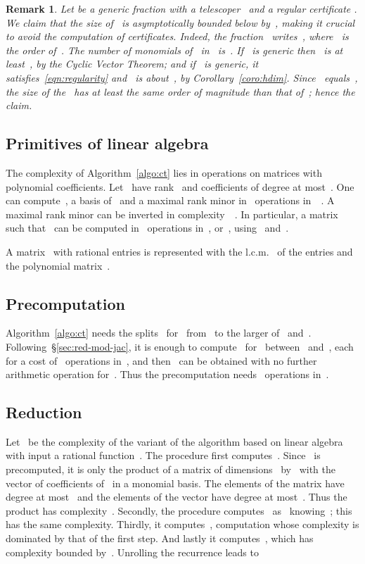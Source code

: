 \documentclass{sig-alternate}
\newtheorem{remark}[thm]{Remark}
\begin{document}
\begin{remark}\label{rem:size-cert}\normalfont
Let  be a generic fraction with a telescoper~ and a regular certificate .
We claim that the size of~ is asymptotically bounded below by~, making it crucial to avoid the computation of certificates.
Indeed, the fraction~ writes~, where~ is the order of~.
The number of monomials of~ in~ is~.
  If~ is generic then~ is at least~, by the Cyclic Vector Theorem;
  and if~ is generic, it satisfies~\eqref{eqn:regularity} and~ is about~, by Corollary~\ref{coro:hdim}.
  Since~ equals~, the size of the~ has at least the same order of magnitude than that of~; hence the claim.
\end{remark}

\subsection{Primitives of linear algebra}\label{sec:pol-linalg}

\noindent The complexity of Algorithm~\ref{algo:ct} lies in operations on matrices with polynomial coefficients.
Let~ have rank~ and coefficients of degree at most~.
One can compute~, a basis of~ and a maximal rank minor in~ operations in~~\cite{Zho13}.
A maximal rank minor can be inverted in complexity~~\cite{JeaVil05}.
In particular, a matrix~ such that~ can be computed in~ operations in~, or~, using~ and~.


A matrix~ with rational entries is represented with the l.c.m.~ of the entries and the polynomial matrix~. 
\subsection{Precomputation}

\noindent Algorithm~\ref{algo:ct} needs the splits~ for~ from~ to the larger of~ and~.
Following~\S\ref{sec:red-mod-jac}, it is enough to compute~ for~ between~ and~, each for a cost of~ operations in~,
and then~ can be obtained with no further arithmetic operation for~.
Thus the precomputation needs~  operations in~.

\subsection{Reduction}

\noindent Let~ be the complexity of the variant of the algorithm  based on linear algebra with input a rational function~.
The procedure first computes~. Since~ is precomputed, it is only the product of a matrix of dimensions~ by~ with the vector of coefficients of~ in a monomial basis.
The elements of the matrix have degree at most~ and the elements of the vector have degree at most~.
Thus the product has complexity~.
Secondly, the procedure computes~ as~ knowing~; this has the same complexity.
Thirdly, it computes~, computation whose complexity is dominated by that of the first step. And lastly it computes~, which has complexity bounded by~.
Unrolling the recurrence leads to
\end{document}
